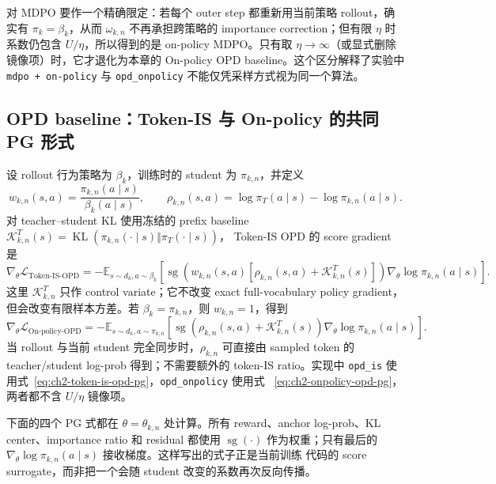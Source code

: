 对 MDPO 要作一个精确限定：若每个 outer step 都重新用当前策略 rollout，确实有
$\pi_k=\beta_k$，从而 $\omega_{k,n}$ 不再承担跨策略的 importance correction；但有限
$\eta$ 时系数仍包含 $U/\eta$，所以得到的是 on-policy MDPO。只有取
$\eta\to\infty$（或显式删除镜像项）时，它才退化为本章的 On-policy OPD
baseline。这个区分解释了实验中 \texttt{mdpo + on-policy} 与 \texttt{opd\_onpolicy}
不能仅凭采样方式视为同一个算法。

\subsection{OPD baseline：Token-IS 与 On-policy 的共同 PG 形式}
\label{subsec:ch2-opd-baselines-in-map}

设 rollout 行为策略为 $\beta_k$，训练时的 student 为 $\pi_{k,n}$，并定义
\begin{equation}
\label{eq:ch2-opd-is-pg}
w_{k,n}(s,a)=\frac{\pi_{k,n}(a\mid s)}{\beta_k(a\mid s)},
\qquad
\rho_{k,n}(s,a)=\log\pi_T(a\mid s)-\log\pi_{k,n}(a\mid s).
\end{equation}
对 teacher--student KL 使用冻结的 prefix baseline
$\mathcal K_{k,n}^{T}(s)=\operatorname{KL}(\pi_{k,n}(\cdot\mid s)\Vert\pi_T(\cdot\mid s))$，
Token-IS OPD 的 score gradient 是
\begin{equation}
\label{eq:ch2-token-is-opd-pg}
\nabla_\theta\mathcal L_{\mathrm{Token\text{-}IS\text{-}OPD}}
=-\mathbb E_{s\sim d_k,a\sim\beta_k}
\left[\operatorname{sg}\!\left(w_{k,n}(s,a)[\rho_{k,n}(s,a)+\mathcal K_{k,n}^{T}(s)]\right)
\nabla_\theta\log\pi_{k,n}(a\mid s)\right].
\end{equation}
这里 $\mathcal K_{k,n}^{T}$ 只作 control variate；它不改变 exact full-vocabulary policy gradient，
但会改变有限样本方差。若 $\beta_k=\pi_{k,n}$，则 $w_{k,n}=1$，得到
\begin{equation}
\label{eq:ch2-onpolicy-opd-pg}
\nabla_\theta\mathcal L_{\mathrm{On\text{-}policy\text{-}OPD}}
=-\mathbb E_{s\sim d_k,a\sim\pi_{k,n}}
\left[\operatorname{sg}\!\left(\rho_{k,n}(s,a)+\mathcal K_{k,n}^{T}(s)\right)
\nabla_\theta\log\pi_{k,n}(a\mid s)\right].
\end{equation}
当 rollout 与当前 student 完全同步时，$\rho_{k,n}$ 可直接由 sampled token 的
teacher/student log-prob 得到；不需要额外的 token-IS ratio。实现中
\texttt{opd\_is} 使用式~\eqref{eq:ch2-token-is-opd-pg}，\texttt{opd\_onpolicy} 使用式
~\eqref{eq:ch2-onpolicy-opd-pg}，两者都不含 $U/\eta$ 镜像项。

下面的四个 PG 式都在 $\theta=\theta_{k,n}$ 处计算。所有 reward、anchor
log-prob、KL center、importance ratio 和 residual 都使用
$\operatorname{sg}(\cdot)$ 作为权重；只有最后的
$\nabla_\theta\log\pi_{k,n}(a\mid s)$ 接收梯度。这样写出的式子正是当前训练
代码的 score surrogate，而非把一个会随 student 改变的系数再次反向传播。

